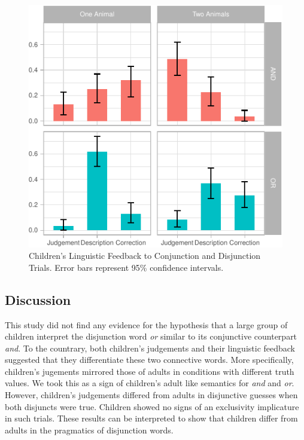 \documentclass[10pt, letterpaper]{article}
\newenvironment{CodeChunk}{}{}
\begin{document}
\begin{CodeChunk}
\begin{figure}[h]

{\centering \includegraphics{figs/feedback_data-1} 

}

\caption[Children's Linguistic Feedback to Conjunction and Disjunction Trials]{Children's Linguistic Feedback to Conjunction and Disjunction Trials. Error bars represent 95\% confidence intervals.}\label{fig:feedback_data}
\end{figure}
\end{CodeChunk}

\subsection{Discussion}\label{discussion-1}

This study did not find any evidence for the hypothesis that a large
group of children interpret the disjunction word \emph{or} similar to
its conjunctive counterpart \emph{and}. To the countrary, both
children's judgements and their linguistic feedback suggested that they
differentiate these two connective words. More specifically, children's
jugements mirrored those of adults in conditions with different truth
values. We took this as a sign of children's adult like semantics for
\emph{and} and \emph{or}. However, children's judgements differed from
adults in disjunctive guesses when both disjuncts were true. Children
showed no signs of an exclusivity implicature in such trials. These
results can be interpreted to show that children differ from adults in
the pragmatics of disjunction words.
\end{document}
